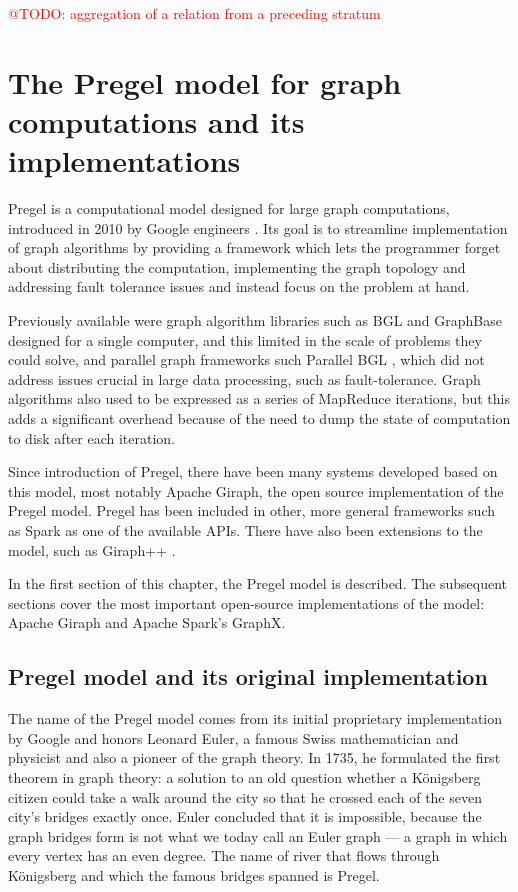 \documentclass{pracamgr}
\makeatletter
\theoremstyle{plain}
\theoremstyle{definition}
\theoremstyle{remark}
\newcommand{\todo}[1]{\textcolor{red}{@TODO: #1}}
\makeatother
\begin{document}
\todo{aggregation of a relation from a preceding stratum}









\chapter{The Pregel model for graph computations and its implementations}\label{r:pregel}

Pregel is a computational model designed for large graph computations, introduced in 2010 by Google engineers \cite{pregel}. Its goal is to streamline implementation of graph algorithms by providing a framework which lets the programmer forget about distributing the computation, implementing the graph topology and addressing fault tolerance issues and instead focus on the problem at hand.

Previously available were graph algorithm libraries such as BGL\cite{bgl} and GraphBase \cite{GraphBase} designed for a single computer, and this limited in the scale of problems they could solve, and parallel graph frameworks such Parallel BGL \cite{parallelbgl}, which did not address issues crucial in large data processing, such as fault-tolerance. Graph algorithms also used to be expressed as a series of MapReduce iterations, but this adds a significant overhead because of the need to dump the state of computation to disk after each iteration.

Since introduction of Pregel, there have been many systems developed based on this model, most notably Apache Giraph, the open source implementation of the Pregel model. Pregel has been included in other, more general frameworks such as Spark as one of the available APIs. There have also been extensions to the model, such as Giraph++ \cite{giraphpp}.

In the first section of this chapter, the Pregel model is described. The subsequent sections cover the most important open-source implementations of the model: Apache Giraph and Apache Spark's GraphX.

\section{Pregel model and its original implementation}

The name of the Pregel model comes from its initial proprietary implementation by Google and honors Leonard Euler, a famous Swiss mathematician and physicist and also a pioneer of the graph theory. In 1735, he formulated the first theorem in graph theory: a solution to an old question whether a Königsberg citizen could take a walk around the city so that he crossed each of the seven city's bridges exactly once. Euler concluded that it is impossible, because the graph bridges form is not what we today call an Euler graph --- a graph in which every vertex has an even degree. The name of river that flows through Königsberg and which the famous bridges spanned is Pregel.
\end{document}
